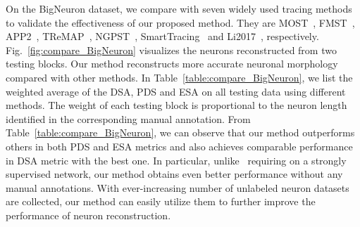 On the BigNeuron dataset, we compare with seven widely used tracing methods to validate the effectiveness of our proposed method.
They are MOST~\cite{Wu2014}, FMST~\cite{Yang2018}, APP2~\cite{Xiao2013}, TReMAP~\cite{Zhou2016}, NGPST~\cite{Quan2015}, SmartTracing~\cite{Chen2015} and Li2017~\cite{Li2017}, respectively.
Fig.~\ref{fig:compare_BigNeuron} visualizes the neurons reconstructed from two testing blocks.
Our method reconstructs more accurate neuronal morphology compared with other methods.
In Table~\ref{table:compare_BigNeuron}, we list the weighted average of the DSA, PDS and ESA on all testing data using different methods.
The weight of each testing block is proportional to the neuron length identified in the corresponding manual annotation.
From Table~\ref{table:compare_BigNeuron}, we can observe that our method outperforms others in both PDS and ESA metrics and also achieves comparable performance in DSA metric with the best one.
In particular, unlike~\cite{Li2017} requiring on a strongly supervised network, our method obtains even better performance without any manual annotations.
With ever-increasing number of unlabeled neuron datasets are collected, our method can easily utilize them to further improve the performance of neuron reconstruction.

